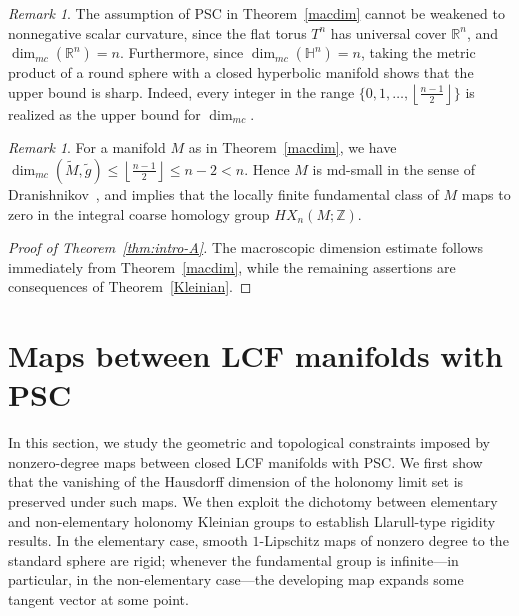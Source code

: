 \documentclass[12pt,oneside,a4paper]{article}
\theoremstyle{mytheorem}
\theoremstyle{remark}
\newtheorem{remark}[definition]{Remark}
\theoremstyle{definition}
\begin{document}
\begin{remark}
The assumption of PSC in Theorem~\ref{macdim} cannot be weakened to
nonnegative scalar curvature, since the flat torus $T^n$ has universal cover
$\mathbb R^n$, and $\dim_{mc}(\mathbb R^n)=n$.  
Furthermore, since $\dim_{mc}(\mathbb H^n)=n$, taking the metric product of a round sphere with a closed hyperbolic manifold shows that the upper bound is sharp. Indeed, every integer in the range
$\{0,1,\ldots,\left\lfloor\frac{n-1}{2}\right\rfloor\}$
is realized as the upper bound for $\dim_{mc}$.
\end{remark}


\begin{remark}
For a manifold $M$ as in Theorem~\ref{macdim}, we have
$
\dim_{mc}(\widetilde M,\widetilde g)
\le \left\lfloor\frac{n-1}{2}\right\rfloor
\le n-2<n.
$
Hence $M$ is md-small in the sense of Dranishnikov~\cite{zbMATH06371564}, and \cite[Theorem~5.4(2)]{zbMATH06371564} implies that the locally finite fundamental class of $M$ maps to zero in the integral coarse homology group $HX_n(M;\mathbb Z)$.
\end{remark}



\begin{proof}[Proof of Theorem~\ref{thm:intro-A}]
The macroscopic dimension estimate follows immediately from Theorem~\ref{macdim}, while the remaining assertions are consequences of Theorem~\ref{Kleinian}.
\end{proof}





\section{Maps between LCF manifolds with PSC}\label{4}


In this section, we study the geometric and topological constraints imposed by
nonzero-degree maps between closed LCF manifolds with PSC. We first show that
the vanishing of the Hausdorff dimension of the holonomy limit set is preserved
under such maps. We then exploit the dichotomy between elementary and
non-elementary holonomy Kleinian groups to establish Llarull-type rigidity
results. In the elementary case, smooth \(1\)-Lipschitz maps of nonzero degree to
the standard sphere are rigid; whenever the fundamental group is infinite---in
particular, in the non-elementary case---the developing map expands some
tangent vector at some point.
\end{document}
